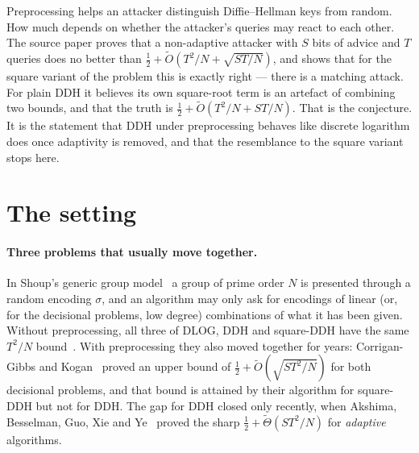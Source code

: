 \documentclass{aicr-conjecture}
\newcommand{\Ot}{\widetilde{O}}
\newcommand{\Th}{\widetilde{\Theta}}
\begin{document}

\vspace{0.4em}

\begin{informalconjecture}
Preprocessing helps an attacker distinguish Diffie--Hellman keys from
random. How much depends on whether the attacker's queries may react to
each other. The source paper proves that a non-adaptive attacker with
$S$ bits of advice and $T$ queries does no better than
$\tfrac{1}{2} + \Ot(T^{2}/N + \sqrt{ST/N})$, and shows that for the
square variant of the problem this is exactly right --- there is a
matching attack. For plain DDH it believes its own square-root term is
an artefact of combining two bounds, and that the truth is
$\tfrac{1}{2} + \Ot(T^{2}/N + ST/N)$. That is the conjecture. It is the
statement that DDH under preprocessing behaves like discrete logarithm
does once adaptivity is removed, and that the resemblance to the square
variant stops here.
\end{informalconjecture}

\section{The setting}\label{sec:setting}

\paragraph{Three problems that usually move together.}
In Shoup's generic group model~\cite{Sho97} a group of prime order $N$
is presented through a random encoding $\sigma$, and an algorithm may
only ask for encodings of linear (or, for the decisional problems, low
degree) combinations of what it has been given. Without preprocessing,
all three of DLOG, DDH and square-DDH have the same $T^{2}/N$
bound~\cite{Sho97,CDG18}. With preprocessing they also moved together
for years: Corrigan-Gibbs and Kogan~\cite{CK18} proved an upper bound of
$\tfrac{1}{2} + \Ot(\sqrt{ST^{2}/N})$ for both decisional problems, and
that bound is attained by their algorithm for square-DDH but not for
DDH\@. The gap for DDH closed only recently, when Akshima, Besselman,
Guo, Xie and Ye~\cite{ABGXY24} proved the sharp
$\tfrac{1}{2} + \Th(ST^{2}/N)$ for \emph{adaptive} algorithms.
\end{document}
